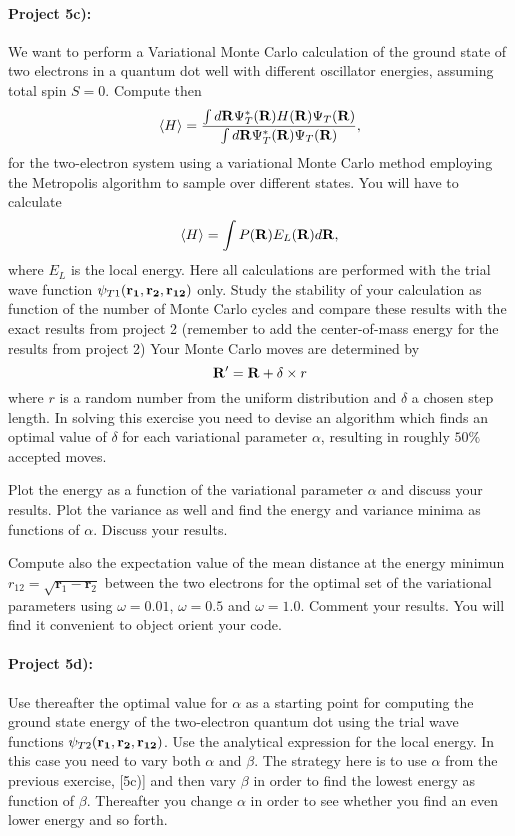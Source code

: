 \documentclass[%
oneside,                 %
final,                   %
10pt]{article}
\begin{document}
\paragraph{Project 5c):}
We want to perform  a Variational Monte Carlo calculation of the ground state of two electrons in a quantum dot well with different oscillator energies, assuming total spin $S=0$.
Compute then
\[
\langle H \rangle = \frac{\int d{\bf
R}\Psi^{\ast}_T({\bf R})H({\bf R})\Psi_T({\bf R})}
{\int d{\bf
R}\Psi^{\ast}_T({\bf R})\Psi_T({\bf R})},
\]
for the two-electron
system using a variational Monte Carlo method employing the Metropolis
algorithm to sample over different states.  You will have to calculate
\[
\langle H \rangle =\int P({\bf R})E_L({\bf R})d{\bf R},
\]
where $E_L$ is the local energy.  Here all
calculations are performed with the trial wave function
$\psi_{T1}({\bf r_1},{\bf r_2}, {\bf r_{12}})$ only.  Study the
stability of your calculation as function of the number of Monte Carlo
cycles and compare these results with the exact results from project
2 (remember to add the center-of-mass energy for the results from project 2)
Your Monte Carlo moves are determined by
\[
{\bf R}' = {\bf R} +\delta\times r
\]
where $r$ is a random number from the uniform distribution and
$\delta$ a chosen step length.  In solving this
		       exercise you need to devise an algorithm which
		       finds an optimal value of $\delta$ for each
		       variational parameter $\alpha$, resulting in
		       roughly $50\%$ accepted moves.

Plot the energy as a function of the variational parameter $\alpha$ and discuss your results. Plot the variance as well
and find the energy and variance minima as functions of $\alpha$. Discuss your results.  

Compute also the expectation value of the mean distance at the energy minimun 
  $r_{12}=\sqrt{\mathbf{r}_1-\mathbf{r}_2}$ between the two electrons for the optimal set of the variational parameters using $\omega=0.01$,
  $\omega=0.5$ and $\omega=1.0$.  Comment your results. 
You will find it convenient to object orient your code.


\paragraph{Project 5d):}
Use thereafter the  optimal value for  $\alpha$ as a starting point for
computing the ground state energy of the two-electron quantum dot using the trial wave functions
$\psi_{T2}({\bf r_1},{\bf r_2}, {\bf r_{12}})$. Use the analytical expression for the local energy.
In this case you need to vary both $\alpha$ and $\beta$.
The strategy here is to use
$\alpha$ from the previous exercise, [5c)] and then
vary $\beta$ in order to find the lowest energy as function of
$\beta$. Thereafter you change
$\alpha$ in order to see whether you find an even lower energy and so forth.
\end{document}
